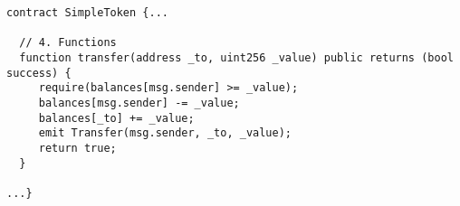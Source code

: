 \begin{lstlisting}[language=Solidity]
contract SimpleToken {...

  // 4. Functions
  function transfer(address _to, uint256 _value) public returns (bool success) {
     require(balances[msg.sender] >= _value);
     balances[msg.sender] -= _value;
     balances[_to] += _value;
     emit Transfer(msg.sender, _to, _value); 
     return true;
  }
    
...}
\end{lstlisting}